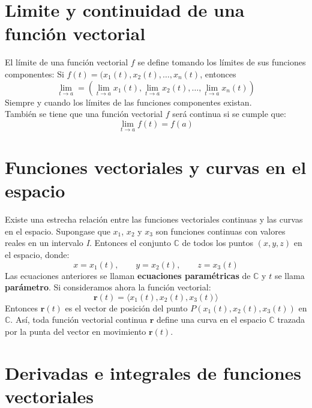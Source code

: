 \documentclass[../main]{subfiles}
\begin{document}
\chapter{Limite y continuidad de una función vectorial}
El límite de una función vectorial $f$ se define tomando los límites de sus funciones componentes: 
Si $f(t)=(x_1(t),x_2(t),\ldots,x_n(t)$, entonces
\begin{equation}
    \lim_{t \rightarrow a}=\left ( \lim_{t \rightarrow a} x_1(t), \lim_{t \rightarrow a} x_2(t),\ldots, \lim_{t \rightarrow a} x_n(t) \right)
\end{equation}
Siempre y cuando los límites de las funciones componentes existan.\\[0.2cm]
También se tiene que una función vectorial $f$ será continua si se cumple que:
\begin{equation}
    \lim_{t \rightarrow a} f(t)=f(a)
\end{equation}
\chapter{Funciones vectoriales y curvas en el espacio}
Existe una estrecha relación entre las funciones vectoriales continuas y las curvas en el espacio. Supongase que $x_1$, $x_2$ y $x_3$ son funciones continuas con valores reales en un intervalo \textit{I}. Entonces el conjunto $\mathbb{C}$ de todos los puntos $(x,y,z)$ en el espacio, donde:
\begin{equation}
    x=x_1(t), \qquad y=x_2(t), \qquad z=x_3(t)
\end{equation}
Las ecuaciones anteriores se llaman \textbf{ecuaciones paramétricas} de $\mathbb{C}$ y $t$ se llama \textbf{parámetro}. Si consideramos ahora la función vectorial:
\begin{equation}
    \mathbf{r}(t)=\langle x_1(t),x_2(t),x_3(t)\rangle
\end{equation}
Entonces $\mathbf{r}(t)$ es el vector de posición del punto $P(x_1(t),x_2(t),x_3(t))$ en $\mathbb{C}$. Así, toda función vectorial continua $\mathbf{r}$ define una curva en el espacio $\mathbb{C}$ trazada por la punta del vector en movimiento $\mathbf{r}(t)$.
\chapter{Derivadas e integrales de funciones vectoriales}
\end{document}
